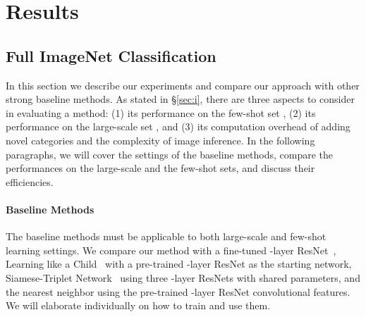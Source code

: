 \section{Results}\label{sec:e}
\subsection{Full ImageNet Classification}
In this section we describe our experiments and compare our approach with other strong baseline methods.  As stated in \S\ref{sec:i}, there are three aspects to consider in evaluating a method: (1) its performance on the few-shot set , (2) its performance on the large-scale set , and (3) its computation overhead of adding novel categories and the complexity of image inference. In the following paragraphs, we will cover the settings of the baseline methods, compare the performances on the large-scale and the few-shot sets, and discuss their efficiencies.

\paragraph{Baseline Methods}
The baseline methods must be applicable to both large-scale and few-shot learning settings. We compare our method with a fine-tuned -layer ResNet~\cite{DBLP:conf/cvpr/HeZRS16}, Learning like a Child~\cite{mao2015learning} with a pre-trained -layer ResNet as the starting network, Siamese-Triplet Network~\cite{siamese,lin2017transfer} using three -layer ResNets with shared parameters, and the nearest neighbor using the pre-trained -layer ResNet convolutional features. We will elaborate individually on how to train and use them.

